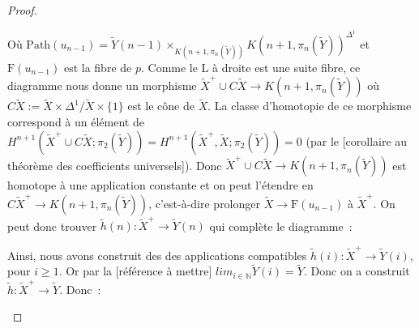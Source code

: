 \documentclass{amsart}
\theoremstyle{plain}
\theoremstyle{definition}
\theoremstyle{remark}
\newcommand{\ensemblenombre }[1]{\mathbb{#1}}
\newcommand{\N}{\ensemblenombre{N}}
\newcommand{\ra}{\rightarrow}
\begin{document}
\begin{proof}
  \begin{center}
  \end{center}
  Où $\mathrm{Path}(u_{n-1})={\tilde{Y}(n-1)\times_{K(n+1,\pi_n(\tilde{Y}))} K(n+1,\pi_n(\tilde{Y}))^{\Delta^1}}$ et $\mathrm{F}(u_{n-1})$
  est la fibre de $p$.
  Comme le L à droite est une suite fibre, ce diagramme nous donne un morphisme $\tilde{X}^+\cup C\tilde{X}\ra K(n+1,\pi_n(\tilde{Y}))$
  où $C\tilde{X}:=\tilde{X}\times\Delta^1 / \tilde{X}\times\{1\}$ est le cône de $\tilde{X}$.
  La classe d'homotopie de ce morphisme correspond à un élément de
  $H^{n+1}(\tilde{X}^+\cup C\tilde{X};\pi_2(\tilde{Y}))=H^{n+1}(\tilde{X}^+,\tilde{X};\pi_2(\tilde{Y}))=0$
  (par le [corollaire au théorème des coefficients universels]). Donc $\tilde{X}^+\cup C\tilde{X}\ra K(n+1,\pi_n(\tilde{Y}))$
  est homotope à une application constante et on peut l'étendre en $C\tilde{X}^+\ra K(n+1,\pi_n(\tilde{Y}))$,
  c'est-à-dire prolonger $\tilde{X}\ra \mathrm{F}(u_{n-1})$ à $\tilde{X}^+$. On peut donc trouver $\tilde{h}(n):\tilde{X}^+\ra \tilde{Y}(n)$
  qui complète le diagramme~:
  \begin{center}
  \end{center}
  Ainsi, nous avons construit des des applications compatibles $\tilde{h}(i):\tilde{X}^+\ra \tilde{Y}(i)$, pour $i\geq 1$.
  Or par la [référence à mettre] $lim_{i\in \N}\tilde{Y}(i)=\tilde{Y}$. Donc on a construit $\tilde{h}:\tilde{X}^+\ra \tilde{Y}$.
  Donc~:
  \begin{center}

\end{center}
\end{proof}
\end{document}
